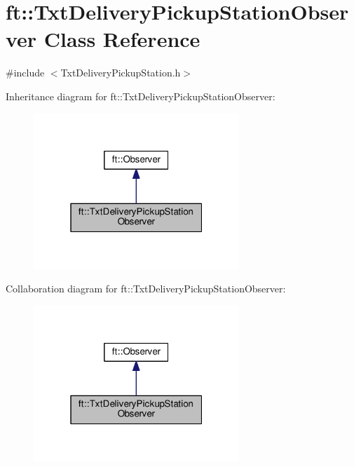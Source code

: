 \hypertarget{classft_1_1_txt_delivery_pickup_station_observer}{}\section{ft\+:\+:Txt\+Delivery\+Pickup\+Station\+Observer Class Reference}
\label{classft_1_1_txt_delivery_pickup_station_observer}


{\ttfamily \#include $<$Txt\+Delivery\+Pickup\+Station.\+h$>$}



Inheritance diagram for ft\+:\+:Txt\+Delivery\+Pickup\+Station\+Observer\+:
\nopagebreak
\begin{figure}[H]
\begin{center}
\leavevmode
\includegraphics[width=220pt]{classft_1_1_txt_delivery_pickup_station_observer__inherit__graph}
\end{center}
\end{figure}


Collaboration diagram for ft\+:\+:Txt\+Delivery\+Pickup\+Station\+Observer\+:
\nopagebreak
\begin{figure}[H]
\begin{center}
\leavevmode
\includegraphics[width=220pt]{classft_1_1_txt_delivery_pickup_station_observer__coll__graph}
\end{center}
\end{figure}
